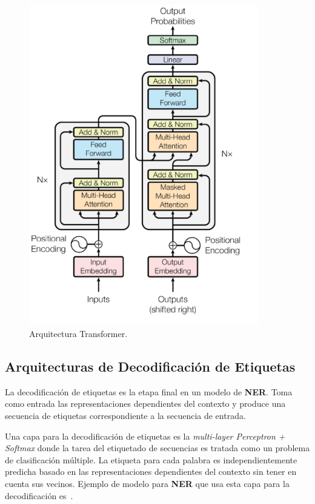 \begin{figure}[h!]
	\centering
	\includegraphics[width = 10cm]{Imagenes/Transformer.png}
	\caption{Arquitectura Transformer.}\label{fig:transformer}
\end{figure}


\subsection{Arquitecturas de Decodificaci\'on de Etiquetas}

La decodificaci\'on de etiquetas es la etapa final en un modelo de \textbf{NER}. Toma como entrada las representaciones dependientes del contexto y produce una secuencia de etiquetas correspondiente a la secuencia de entrada.

Una capa para la decodificaci\'on de etiquetas es la \emph{multi-layer Perceptron + Softmax} donde la tarea del etiquetado de secuencias es tratada como un problema de clasificaci\'on m\'ultiple. La etiqueta para cada palabra es independientemente predicha basado en las representaciones dependientes del contexto sin tener en cuenta sus vecinos. Ejemplo de modelo para \textbf{NER} que usa esta capa para la decodificaci\'on es~\cite{li2017leveraging}.


